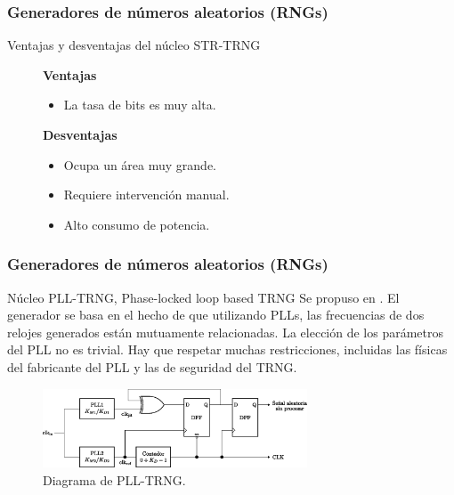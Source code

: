 \documentclass[10pt]{beamer}
\begin{document}
\begin{frame}
    \frametitle{Generadores de números aleatorios (RNGs)}
    \begin{block}{Ventajas y desventajas del núcleo STR-TRNG}
        \justifying
          \begin{figure}[!h]
				\begin{minipage}[t]{0.48\textwidth}
					\textbf{Ventajas}
					\begin{itemize}
						\justifying
						\item La tasa de bits es muy alta.
					\end{itemize}
				\end{minipage} \hfill \begin{minipage}[t]{0.48\textwidth}
					\textbf{Desventajas}
					\begin{itemize}
						\justifying
						\item Ocupa un área muy grande.
						\item Requiere intervención manual.
						\item Alto consumo de potencia.
					\end{itemize}
				\end{minipage}
			\end{figure}		
	\end{block}
\end{frame}

\begin{frame}
    \frametitle{Generadores de números aleatorios (RNGs)}
    \begin{block}{Núcleo PLL-TRNG, Phase-locked loop based TRNG}
        \justifying
        Se propuso en \cite{Fischer2003}. El generador se basa en el hecho de que utilizando PLLs, las frecuencias de dos relojes generados están mutuamente relacionadas. La elección de los parámetros del PLL no es trivial. Hay que respetar muchas restricciones, incluidas las físicas del fabricante del PLL y las de seguridad del TRNG.
	\end{block}
	\begin{figure}[hbtp]
	    \centering
	    \includegraphics[width=0.7\textwidth]{A6_PLL_TRNG}
	    \caption{Diagrama de PLL-TRNG.}
        \label{fig:A6_PLL_TRNG}
    \end{figure}
\end{frame}
\end{document}
